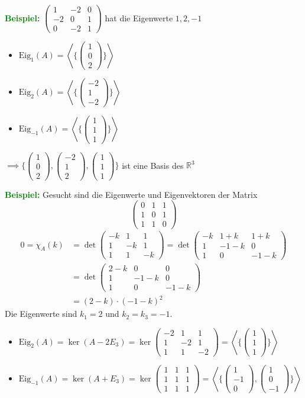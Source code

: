 \documentclass{article}
\newcommand{\green}[1]{\textcolor{green}{#1}}
\newcommand{\ex}{\green{\textbf{Beispiel: }}}
\newcommand{\R}{\mathbb{R}}
\newcommand{\vvvec}[3]{\begin{pmatrix}#1\\#2\\#3\end{pmatrix}}
\newcommand{\spann}[1]{\left\langle#1\right\rangle}
\newcommand{\eig}{\text{Eig}}
\begin{document}
\ex $\begin{pmatrix}
    1 & -2 & 0\\
    -2 & 0 & 1\\
    0 & -2 & 1
\end{pmatrix}$ hat die Eigenwerte $1,2,-1$

\begin{itemize}
    \item $\eig_1(A) = \spann{\{\vvvec{1}{0}{2}\}}$
    \item $\eig_2(A) = \spann{\{\vvvec{-2}{1}{-2}\}}$
    \item $\eig_{-1}(A) = \spann{\{\vvvec{1}{1}{1}\}}$
\end{itemize}

$\implies \{\vvvec{1}{0}{2}, \vvvec{-2}{1}{2}, \vvvec{1}{1}{1}\}$ ist eine Basis des $\R^3$

\ex Gesucht sind die Eigenwerte und Eigenvektoren der Matrix
$$\begin{pmatrix}
    0 & 1 & 1\\
    1 & 0 & 1\\
    1 & 1 & 0
\end{pmatrix}$$
\begin{align*}
    0 = \chi_A(k) &= \det \begin{pmatrix}
        -k & 1 & 1\\
        1 & -k & 1\\
        1 & 1 & -k
    \end{pmatrix} = \det \begin{pmatrix}
        -k & 1 + k & 1 + k\\
        1 & -1 - k & 0\\
        1 & 0 & -1 - k
    \end{pmatrix}\\
    &= \det \begin{pmatrix}
        2-k & 0 & 0\\
        1 & -1-k & 0\\
        1 & 0 & -1-k
    \end{pmatrix}\\
    &= (2-k) \cdot (-1-k)^2
\end{align*}
Die Eigenwerte sind $k_1 = 2$ und $k_2 = k_3 = -1$.
\begin{itemize}
    \item $\eig_2(A) = \ker(A - 2E_3) = \ker \begin{pmatrix}
        -2 & 1 & 1\\
        1 & -2 & 1\\
        1 & 1 & -2
    \end{pmatrix} = \spann{\{\vvvec{1}{1}{1}\}}$
    \item $\eig_{-1}(A) = \ker(A + E_3) = \ker \begin{pmatrix}
        1 & 1 & 1\\
        1 & 1 & 1\\
        1 & 1 & 1
    \end{pmatrix} = \spann{\{\vvvec{1}{-1}{0}, \vvvec{1}{0}{-1}\}}$
\end{itemize}
\end{document}
